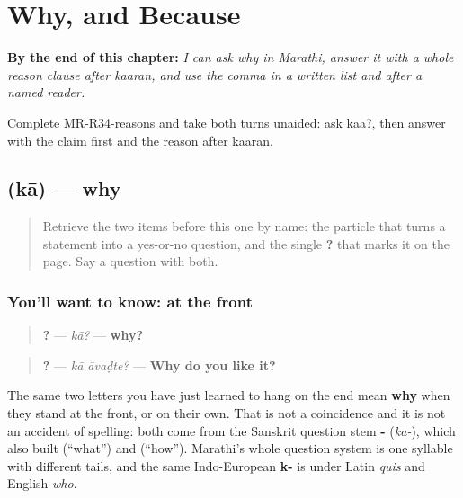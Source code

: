 
\chapter{Why, and Because}
\label{ch:mr-why-because}

\begin{chapteropening}
\textbf{By the end of this chapter:} \emph{I can ask why in Marathi, answer it with a whole reason clause after kaaran, and use the comma in a written list and after a named reader.}

Complete MR-R34-reasons and take both turns unaided: ask kaa?, then answer with the claim first and the reason after kaaran.
\end{chapteropening}

\section[\texorpdfstring{\mr{का} …? (kā …?)}{का …? (kā …?)}]{ (kā) — why}

\label{lesson:MR-C34-kaa-why}



\begin{quote}
Retrieve the two items before this one by name: the particle \textbf{} that turns a statement into a yes-or-no question, and the single \textbf{?} that marks it on the page. Say a question with both.
\end{quote}

\subsection*{You'll want to know:  at the front}
\begin{quote}
\textbf{?} — \emph{kā?} — \textbf{why?}
\end{quote}

\begin{quote}
\textbf{ ?} — \emph{kā āvaḍte?} — \textbf{Why do you like it?}
\end{quote}

The same two letters you have just learned to hang on the end mean \textbf{why} when they stand at the front, or on their own. That is not a coincidence and it is not an accident of spelling: both come from the Sanskrit question stem \textbf{-} (\emph{ka-}), which also built \textbf{} (\textquotedblleft{}what\textquotedblright{}) and \textbf{} (\textquotedblleft{}how\textquotedblright{}). Marathi's whole question system is one syllable with different tails, and the same Indo-European \textbf{k-} is under Latin \emph{quis} and English \emph{who}.

